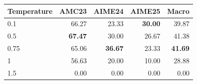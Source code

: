 \begin{center}
    \centering
    \small
    \setlength{\tabcolsep}{5.0pt}
    \label{tab:deepscaler_teacher_temperature}
    \begin{tabular}{@{}lrrrr@{}}
        \toprule
        Temperature & AMC23 & AIME24 & AIME25 & Macro \\
        \midrule
        0.1 & 66.27 & 23.33 & \textbf{30.00} & 39.87 \\
        0.5 & \textbf{67.47} & 30.00 & 26.67 & 41.38 \\
        0.75 & 65.06 & \textbf{36.67} & 23.33 & \textbf{41.69} \\
        1 & 56.63 & 20.00 & 10.00 & 28.88 \\
        1.5 & 0.00 & 0.00 & 0.00 & 0.00 \\
        \bottomrule
    \end{tabular}
\end{center}
